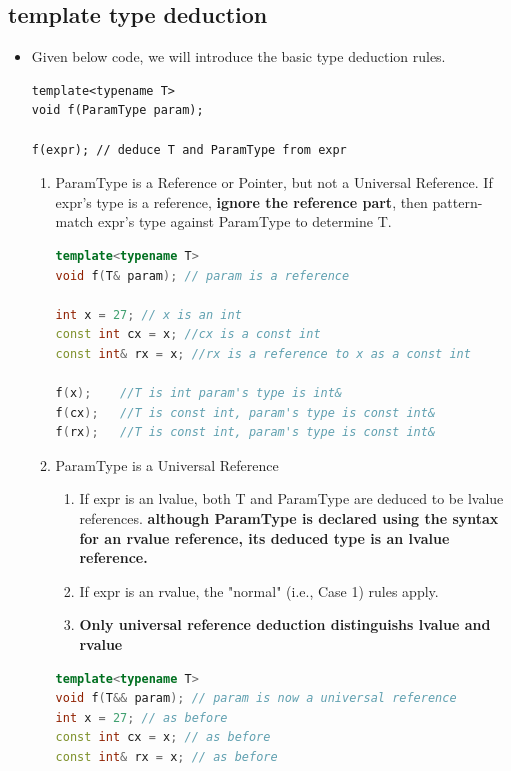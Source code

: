 \documentclass[a4paper,11pt,twoside]{book}
\begin{document}
\subsection{template type deduction}
\begin{itemize}

	\item Given below code, we will introduce the basic type deduction rules.
\begin{lstlisting}[numbers=none]
template<typename T>
void f(ParamType param);

f(expr); // deduce T and ParamType from expr
\end{lstlisting}

\begin{enumerate}
	
	\item ParamType is a Reference or Pointer, but not a Universal Reference. If expr's type is a reference, \textbf{ignore the reference part}, then pattern-match expr's type against ParamType to determine T.
\begin{lstlisting}[frame=single, language=c++]
template<typename T>
void f(T& param); // param is a reference
	
int x = 27; // x is an int
const int cx = x; //cx is a const int
const int& rx = x; //rx is a reference to x as a const int
	
f(x);    //T is int param's type is int&
f(cx);   //T is const int, param's type is const int&
f(rx);   //T is const int, param's type is const int&
\end{lstlisting}
	
	\item ParamType is a Universal Reference
	
	\begin{enumerate}
		\item If expr is an lvalue, both T and ParamType are deduced to be lvalue references.
		\textbf{although ParamType is declared using the syntax for an rvalue reference, its deduced type is an lvalue reference.}
		
		\item If expr is an rvalue, the "normal" (i.e., Case 1) rules apply.
		
		\item \textbf{Only universal reference deduction distinguishs lvalue and rvalue}
	\end{enumerate}
	
\begin{lstlisting}[frame=single, language=c++]
template<typename T>
void f(T&& param); // param is now a universal reference
int x = 27; // as before
const int cx = x; // as before
const int& rx = x; // as before
	

\end{lstlisting}
\end{enumerate}
\end{itemize}
\end{document}
